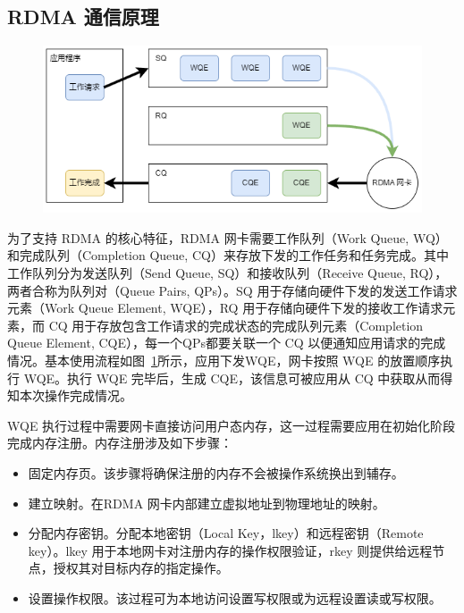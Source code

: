 {\subsection{RDMA 通信原理}
\begin{figure}[!htbp]
    \centering
    \includegraphics[width=\linewidth]{Img/RDMA_queues.png}
    \label{fig:rdma-queue-model}
\end{figure}
为了支持 RDMA 的核心特征，RDMA 网卡需要工作队列（Work Queue, WQ）和完成队列（Completion Queue, CQ）来存放下发的工作任务和任务完成。其中工作队列分为发送队列（Send Queue, SQ）和接收队列（Receive Queue, RQ），两者合称为队列对（Queue Pairs, QPs）。SQ 用于存储向硬件下发的发送工作请求元素（Work Queue Element, WQE），RQ 用于存储向硬件下发的接收工作请求元素，而 CQ 用于存放包含工作请求的完成状态的完成队列元素（Completion Queue Element, CQE），每一个QPs都要关联一个 CQ 以便通知应用请求的完成情况。基本使用流程如图~\ref{fig:rdma-queue-model}所示，应用下发WQE，网卡按照 WQE 的放置顺序执行 WQE。执行 WQE 完毕后，生成 CQE，该信息可被应用从 CQ 中获取从而得知本次操作完成情况。

WQE 执行过程中需要网卡直接访问用户态内存，这一过程需要应用在初始化阶段完成内存注册。内存注册涉及如下步骤：
\begin{itemize}
    \item 固定内存页。该步骤将确保注册的内存不会被操作系统换出到辅存。
    \item 建立映射。在RDMA 网卡内部建立虚拟地址到物理地址的映射。
    \item 分配内存密钥。分配本地密钥（Local Key，lkey）和远程密钥（Remote key）。lkey 用于本地网卡对注册内存的操作权限验证，rkey 则提供给远程节点，授权其对目标内存的指定操作。
    \item 设置操作权限。该过程可为本地访问设置写权限或为远程设置读或写权限。
\end{itemize}
}
